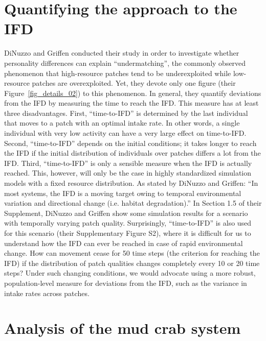 \begin{refsection}
	\section*{Quantifying the approach to the IFD}
	
	DiNuzzo and Griffen conducted their study in order to investigate whether personality differences can explain ``undermatching'', the commonly observed phenomenon that high-resource patches tend to be underexploited while low-resource patches are overexploited.
	Yet, they devote only one figure (their Figure~\ref{fig_details_02}) to this phenomenon.
	In general, they quantify deviations from the IFD by measuring the time to reach the IFD.
	This measure has at least three disadvantages.
	First, ``time-to-IFD'' is determined by the last individual that moves to a patch with an optimal intake rate.
	In other words, a single individual with very low activity can have a very large effect on time-to-IFD.
	Second, ``time-to-IFD'' depends on the initial conditions; it takes longer to reach the IFD if the initial distribution of individuals over patches differs a lot from the IFD.
	Third, ``time-to-IFD'' is only a sensible measure when the IFD is actually reached.
	This, however, will only be the case in highly standardized simulation models with a fixed resource distribution.
	As stated by DiNuzzo and Griffen: ``In most systems, the IFD is a moving target owing to temporal environmental variation and directional change (i.e. habitat degradation).'' 
	In Section 1.5 of their Supplement, DiNuzzo and Griffen show some simulation results for a scenario with temporally varying patch quality.
	Surprisingly, ``time-to-IFD'' is also used for this scenario (their Supplementary Figure S2), where it is difficult for us to understand how the IFD can ever be reached in case of rapid environmental change.
	How can movement cease for 50 time steps (the criterion for reaching the IFD) if the distribution of patch qualities changes completely every 10 or 20 time steps? Under such changing conditions, we would advocate using a more robust, population-level measure for deviations from the IFD, such as the variance in intake rates across patches. 
	
	\section*{Analysis of the mud crab system}
	

\end{refsection}
